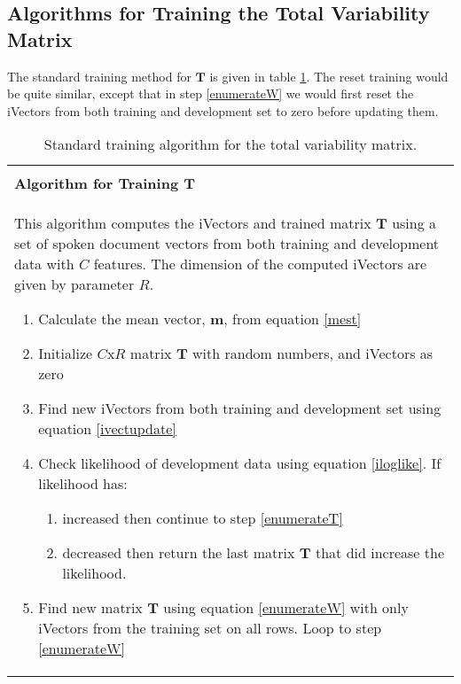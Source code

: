 \subsection{Algorithms for Training the Total Variability Matrix}
\label{ap:vanivecttrain}

The standard training method for $\mathbf{T}$ is given in table \ref{algtrain}. The reset training would be quite similar, except that in step \ref{enumerateW} we would first reset the iVectors from both training and development set to zero before updating them.

\begin{table}
\begin{tabular}{ | p{} | }
\hline
\\
\textbf{Algorithm for Training $\mathbf{T}$}
\\
This algorithm computes the iVectors and trained matrix $\mathbf{T}$ using a set of spoken document vectors from both training and development data with $C$ features. The dimension of the computed iVectors are given by parameter $R$.
\begin{enumerate}
  \item Calculate the mean vector, $\mathbf{m}$, from equation \ref{mest} 
  \item Initialize $C$x$R$ matrix $\mathbf{T}$ with random numbers, and iVectors as zero
  \item \label{enumerateW} Find new iVectors from both training and development set using equation \ref{ivectupdate}
  \item \label{stopcondition} Check likelihood of development data using equation \ref{iloglike}. If likelihood has:
  \begin{enumerate}
    \item increased then continue to step \ref{enumerateT}
    \item decreased then return the last matrix $\mathbf{T}$ that did increase the likelihood.
  \end{enumerate}
  \item \label{enumerateT} Find new matrix $\mathbf{T}$ using equation \ref{enumerateW} with only iVectors from the training set on all rows. Loop to step \ref{enumerateW}
\end{enumerate}
\\
\hline
\end{tabular}
\caption{Standard training algorithm for the total variability matrix.}
\label{algtrain}
\end{table}

